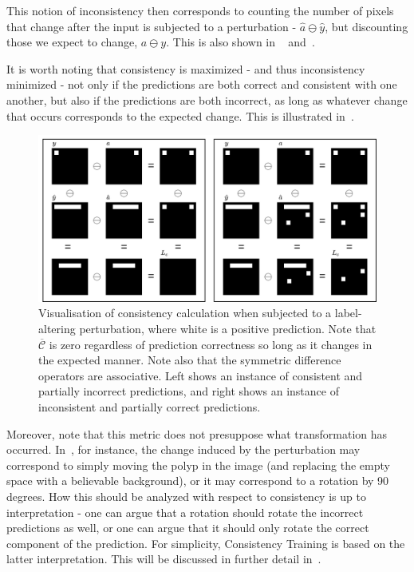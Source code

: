 This notion of inconsistency then corresponds to counting the number of pixels that change after the input is subjected to a perturbation - \(\hat{a}\ominus \hat{y}\), but discounting those we expect to change, \(a\ominus y\). This is also shown in ~ and~.

It is worth noting that consistency is maximized - and thus inconsistency minimized - not only if the predictions are both correct and consistent with one another, but also if the predictions are both incorrect, as long as whatever change that occurs corresponds to the expected change. This is illustrated in~.
\begin{figure}[htb]
    \includegraphics[width=\linewidth]{illustrations/loss_visualisation.drawio.png}
    \caption[Segmentation Consistency Visualization 2]{Visualisation of consistency calculation when subjected to a label-altering perturbation, where white is a positive prediction. Note that \(\overline{\mathcal{C}}\) is zero regardless of prediction correctness so long as it changes in the expected manner. Note also that the symmetric difference operators are associative. Left shows an instance of consistent and partially incorrect predictions, and right shows an instance of inconsistent and partially correct predictions.}
    \label{loss_fn}
\end{figure}  
    
Moreover, note that this metric does not presuppose what transformation has occurred. In~, for instance, the change induced by the perturbation may correspond to simply moving the polyp in the image (and replacing the empty space with a believable background), or it may correspond to a rotation by 90 degrees. How this should be analyzed with respect to consistency is up to interpretation - one can argue that a rotation should rotate the incorrect predictions as well, or one can argue that it should only rotate the correct component of the prediction. For simplicity, Consistency Training is based on the latter interpretation. This will be discussed in further detail in~.

